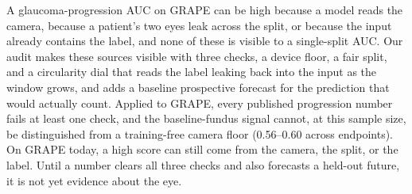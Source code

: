 A glaucoma-progression AUC on GRAPE can be high because a model reads the camera, because a patient's two eyes leak
across the split, or because the input already contains the label, and none of these is visible to a single-split AUC.
Our audit makes these sources visible with three checks, a device floor, a fair split, and a circularity dial that
reads the label leaking back into the input as the window grows, and adds a baseline prospective forecast for the
prediction that would actually count. Applied to GRAPE, every published
progression number fails at least one check, and the baseline-fundus signal cannot, at this sample size, be
distinguished from a training-free camera floor (\num{0.56}--\num{0.60} across endpoints). On GRAPE today, a high score
can still come from the camera, the split, or the label. Until a number clears all three checks and also forecasts a
held-out future, it is not yet evidence about the eye.
